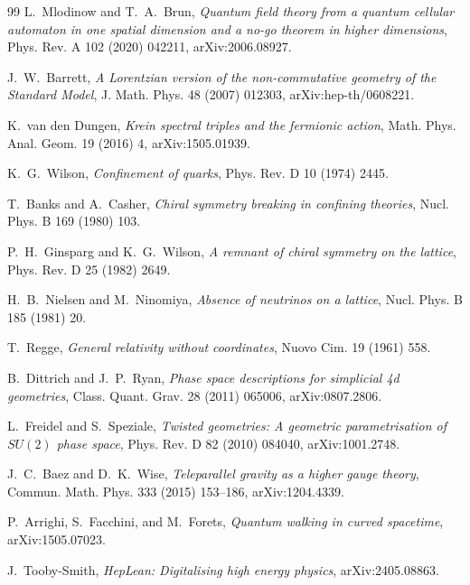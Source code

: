 \documentclass[11pt]{article}
\begin{document}
\begin{thebibliography}{99}
L.~Mlodinow and T.~A.~Brun,
\emph{Quantum field theory from a quantum cellular automaton in one spatial
dimension and a no-go theorem in higher dimensions},
Phys. Rev. A 102 (2020) 042211, arXiv:2006.08927.

J.~W.~Barrett,
\emph{A Lorentzian version of the non-commutative geometry of the Standard
Model}, J. Math. Phys. 48 (2007) 012303, arXiv:hep-th/0608221.

K.~van den Dungen,
\emph{Krein spectral triples and the fermionic action},
Math. Phys. Anal. Geom. 19 (2016) 4, arXiv:1505.01939.

K.~G.~Wilson,
\emph{Confinement of quarks}, Phys. Rev. D 10 (1974) 2445.

T.~Banks and A.~Casher,
\emph{Chiral symmetry breaking in confining theories},
Nucl. Phys. B 169 (1980) 103.

P.~H.~Ginsparg and K.~G.~Wilson,
\emph{A remnant of chiral symmetry on the lattice},
Phys. Rev. D 25 (1982) 2649.

H.~B.~Nielsen and M.~Ninomiya,
\emph{Absence of neutrinos on a lattice}, Nucl. Phys. B 185 (1981) 20.

T.~Regge,
\emph{General relativity without coordinates}, Nuovo Cim. 19 (1961) 558.

B.~Dittrich and J.~P.~Ryan,
\emph{Phase space descriptions for simplicial 4d geometries},
Class. Quant. Grav. 28 (2011) 065006, arXiv:0807.2806.

L.~Freidel and S.~Speziale,
\emph{Twisted geometries: A geometric parametrisation of $SU(2)$ phase space},
Phys. Rev. D 82 (2010) 084040, arXiv:1001.2748.

J.~C.~Baez and D.~K.~Wise,
\emph{Teleparallel gravity as a higher gauge theory},
Commun. Math. Phys. 333 (2015) 153--186, arXiv:1204.4339.

P.~Arrighi, S.~Facchini, and M.~Forets,
\emph{Quantum walking in curved spacetime}, arXiv:1505.07023.

J.~Tooby-Smith,
\emph{HepLean: Digitalising high energy physics}, arXiv:2405.08863.

\end{thebibliography}
\end{document}
